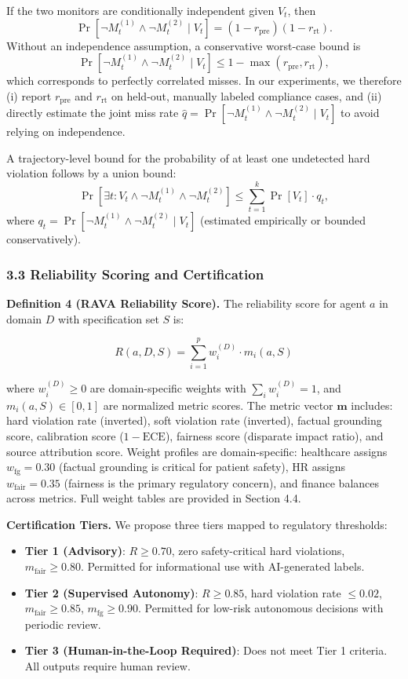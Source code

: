 \documentclass[
]{article}
\providecommand{\tightlist}{%
  \setlength{\itemsep}{0pt}\setlength{\parskip}{0pt}}
\begin{document}
If the two monitors are conditionally independent given $V_t$, then
\[
\Pr[\neg M_t^{(1)} \wedge \neg M_t^{(2)} \mid V_t] = (1-r_{\text{pre}})(1-r_{\text{rt}}).
\]
Without an independence assumption, a conservative worst-case bound is
\[
\Pr[\neg M_t^{(1)} \wedge \neg M_t^{(2)} \mid V_t] \le 1-\max(r_{\text{pre}}, r_{\text{rt}}),
\]
which corresponds to perfectly correlated misses. In our experiments, we therefore (i) report $r_{\text{pre}}$ and $r_{\text{rt}}$ on held-out, manually labeled compliance cases, and (ii) directly estimate the joint miss rate $\hat{q}=\Pr[\neg M_t^{(1)} \wedge \neg M_t^{(2)} \mid V_t]$ to avoid relying on independence.

A trajectory-level bound for the probability of at least one undetected hard violation follows by a union bound:
\[
\Pr[\exists t: V_t \wedge \neg M_t^{(1)} \wedge \neg M_t^{(2)}] \le \sum_{t=1}^{k} \Pr[V_t] \cdot q_t,
\]
where $q_t=\Pr[\neg M_t^{(1)} \wedge \neg M_t^{(2)} \mid V_t]$ (estimated empirically or bounded conservatively).

\hypertarget{33-reliability-scoring-and-certification}{%
\subsubsection{3.3 Reliability Scoring and Certification}\label{33-reliability-scoring-and-certification}}

\textbf{Definition 4 (RAVA Reliability Score).} The reliability score for agent $a$ in domain $D$ with specification set $S$ is:

\[
R(a, D, S) = \sum_{i=1}^{p} w_i^{(D)} \cdot m_i(a, S)
\]

where $w_i^{(D)} \geq 0$ are domain-specific weights with $\sum_i w_i^{(D)} = 1$, and $m_i(a, S) \in [0,1]$ are normalized metric scores. The metric vector $\mathbf{m}$ includes: hard violation rate (inverted), soft violation rate (inverted), factual grounding score, calibration score ($1 - \text{ECE}$), fairness score (disparate impact ratio), and source attribution score. Weight profiles are domain-specific: healthcare assigns $w_{\text{fg}} = 0.30$ (factual grounding is critical for patient safety), HR assigns $w_{\text{fair}} = 0.35$ (fairness is the primary regulatory concern), and finance balances across metrics. Full weight tables are provided in Section 4.4.

\textbf{Certification Tiers.} We propose three tiers mapped to regulatory thresholds:

\begin{itemize}
\tightlist
\item
  \textbf{Tier 1 (Advisory)}: $R \geq 0.70$, zero safety-critical hard violations, $m_{\text{fair}} \geq 0.80$. Permitted for informational use with AI-generated labels.
\item
  \textbf{Tier 2 (Supervised Autonomy)}: $R \geq 0.85$, hard violation rate $\leq 0.02$, $m_{\text{fair}} \geq 0.85$, $m_{\text{fg}} \geq 0.90$. Permitted for low-risk autonomous decisions with periodic review.
\item
  \textbf{Tier 3 (Human-in-the-Loop Required)}: Does not meet Tier 1 criteria. All outputs require human review.
\end{itemize}
\end{document}

